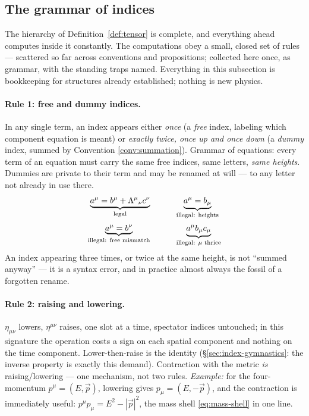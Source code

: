 \documentclass[11pt]{article}
\theoremstyle{plain}
\theoremstyle{definition}
\theoremstyle{remark}
\newcommand{\vp}{\vec{p}}
\begin{document}
\subsection{The grammar of indices}
\label{sec:index-grammar}

The hierarchy of Definition~\ref{def:tensor} is complete, and
everything ahead computes inside it constantly. The computations obey
a small, closed set of rules --- scattered so far across conventions
and propositions; collected here once, as grammar, with the standing
traps named. Everything in this subsection is bookkeeping for
structures already established; nothing is new physics.

\paragraph{Rule 1: free and dummy indices.} In any single term, an
index appears either \emph{once} (a \emph{free} index, labeling which
component equation is meant) or \emph{exactly twice, once up and once
down} (a \emph{dummy} index, summed by Convention
\ref{conv:summation}). Grammar of equations: every term of an
equation must carry the same free indices, same letters, \emph{same
heights}. Dummies are private to their term and may be renamed at
will --- to any letter not already in use there.
\begin{gather}
  \underbrace{a^\mu = b^\mu + \Lambda^\mu{}_\nu c^\nu}_{\text{legal}}
  \qquad\quad
  \underbrace{a^\mu = b_\mu}_{\text{illegal: heights}}
  \notag\\[2pt]
  \underbrace{a^\mu = b^\nu}_{\text{illegal: free mismatch}}
  \qquad\quad
  \underbrace{a^\mu b_\mu c_\mu}_{\text{illegal: } \mu \text{ thrice}}
\end{gather}
An index appearing three times, or twice at the same height, is not
``summed anyway'' --- it is a syntax error, and in practice almost
always the fossil of a forgotten rename.

\paragraph{Rule 2: raising and lowering.} $\eta_{\mu\nu}$ lowers,
$\eta^{\mu\nu}$ raises, one slot at a time, spectator indices
untouched; in this signature the operation costs a sign on each
spatial component and nothing on the time component. Lower-then-raise
is the identity (\S\ref{sec:index-gymnastics}: the inverse property
is exactly this demand). Contraction with the metric \emph{is}
raising/lowering --- one mechanism, not two rules.
\emph{Example:} for the four-momentum $p^\mu = (E, \vp)$, lowering
gives $p_\mu = (E, -\vp)$, and the contraction is immediately useful:
$p^\mu p_\mu = E^2 - |\vp|^2$, the mass shell
\eqref{eq:mass-shell} in one line.
\end{document}
